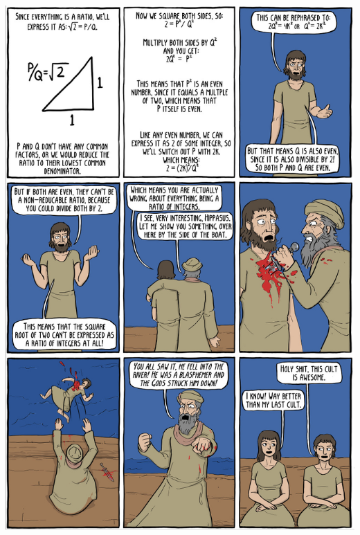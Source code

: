 \documentclass[addpoints]{exam}
\theoremstyle{definition}
\theoremstyle{claim}
\begin{document}
\begin{questions}
  \includegraphics[width=\textwidth]{pyth2}
\end{questions}
\end{document}
